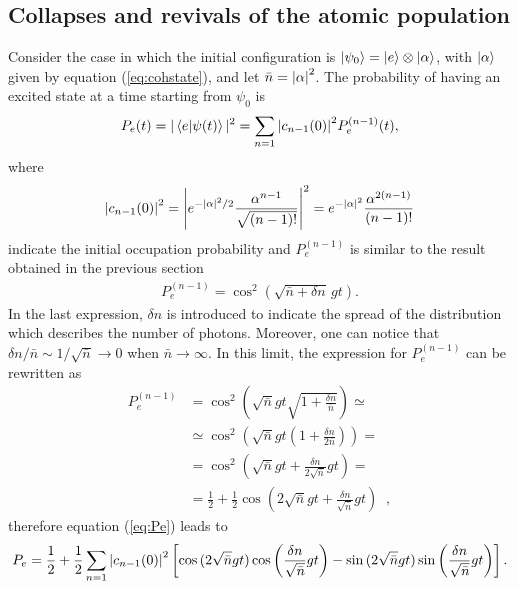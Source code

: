 \subsection{Collapses and revivals of the atomic population}

Consider the case in which the initial configuration is $\ket{\psi_0} = \ket{e} \otimes \ket{\alpha}$, with $\ket{\alpha}$ given by equation (\ref{eq:cohstate}), and let $\Bar{n} = \abs{\alpha}^2$. The probability of having an excited state at a time starting from $\psi_0$ is 
\begin{align}
    P_e(t) = |\bra{e}\ket{\psi(t)}|^2 = \sum_{n=1} \abs{c_{n-1}(0)}^2 P_e^{(n-1)}(t), 
    \label{eq:Pe}
\end{align}
where 
\begin{align*}
    \abs{c_{n-1}(0)}^2 = \abs{e^{-\abs{\alpha}^2/2 } \frac{\alpha^{n-1}}{\sqrt{(n-1)!}}}^2 = e^{-\abs{\alpha}^2} \frac{\alpha^{2(n-1)}}{(n-1)!} 
\end{align*} 
indicate the initial occupation probability and $P_e^{(n-1)}$ is similar to the result obtained in the previous section
\begin{align*}
    P_e^{(n-1)} = \cos^2{(\sqrt{\bar{n}+ \delta n} \, gt )}.
\end{align*}
In the last expression, $\delta n$ is introduced to indicate the spread of the distribution which describes the number of photons. Moreover, one can notice that $\delta n/\bar{n} \sim 1/\sqrt{\bar{n}} \to 0$ when $\bar{n} \to \infty$. In this limit, the expression for $P_e^{(n-1)}$ can be rewritten as 
\begin{align*}
    P_e^{(n-1)} & = \cos^2{\left( \sqrt{\bar{n}} gt \sqrt{1 + \frac{\delta n}{\bar{n}}} \right)} \simeq \\
    & \simeq  \cos^2{\left( \sqrt{\bar{n}} gt \left( 1 + \frac{\delta n}{2\bar{n}} \right) \right)} = \\
    & = \cos^2{\left( \sqrt{\bar{n}} gt  + \frac{\delta n}{2\sqrt{\bar{n}}}gt\right)}  = \\
    & = \frac{1}{2} + \frac{1}{2} \cos{\left(2 \sqrt{\bar{n}} g t +  \frac{\delta n}{\sqrt{\bar{n}}}gt \right)} \;\;,
\end{align*}
therefore equation (\ref{eq:Pe}) leads to
\begin{equation*}
    P_e = \frac{1}{2} + \frac{1}{2} \sum_{n=1} \abs{c_{n-1}(0)}^2 \left[ \cos{(2 \sqrt{\bar{n}} gt)} \cos{\left( \frac{\delta n}{\sqrt{\bar{n}}} gt \right)} - \sin{(2 \sqrt{\bar{n}} gt)} \sin{\left( \frac{\delta n}{\sqrt{\bar{n}}} gt \right)}\right]. 
\end{equation*}
